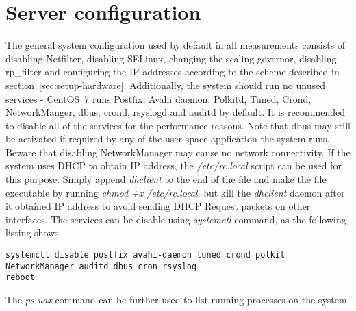 
\section{Server configuration}\label{sec:setup-server}
The general system configuration used by default in all measurements
consists of disabling Netfilter, disabling SELinux, changing the scaling governor, disabling rp\_filter and
configuring the IP addresses according to the scheme described in section~\ref{sec:setup-hardware}.
Additionally, the system should run no unused services - CentOS~7 runs Postfix, Avahi daemon, Polkitd, Tuned, Crond,
NetworkManger, dbus, crond, rsyslogd and auditd by default.
It is recommended to disable all of the services for the performance reasons.
Note that dbus may still be activated if required by any of the user-space application the system runs.
Beware that disabling NetworkManager may cause no network connectivity.
If the system uses DHCP to obtain IP address, the {\it{/etc/rc.local}} script can be used for this purpose.
Simply append {\it{dhclient}} to the end of the file and make the file executable by running {\it{chmod +x /etc/rc.local}},
but kill the {\it{dhclient}} daemon after it obtained IP address to avoid sending DHCP Request packets on other interfaces.
The services can be disable using {\it{systemctl}} command, as the following listing shows.
\begin{lstlisting}
systemctl disable postfix avahi-daemon tuned crond polkit NetworkManager auditd dbus cron rsyslog
reboot
\end{lstlisting}
The {\it{ps uax}} command can be further used to list running processes on the system.
\\


